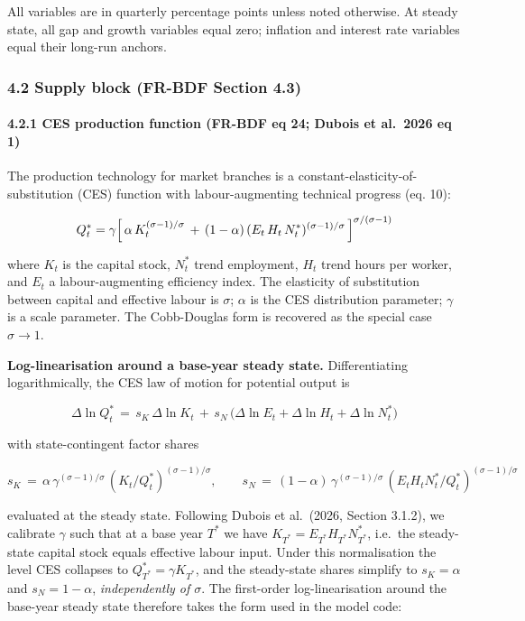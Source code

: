 \documentclass[
]{article}
\begin{document}
All variables are in quarterly percentage points unless noted otherwise.
At steady state, all gap and growth variables equal zero; inflation and
interest rate variables equal their long-run anchors.

\subsubsection{4.2 Supply block (FR-BDF Section
4.3)}\label{supply-block-fr-bdf-section-4.3}

\paragraph{4.2.1 CES production function (FR-BDF eq 24; Dubois et
al.~2026 eq
1)}\label{ces-production-function-fr-bdf-eq-24-dubois-et-al.-2026-eq-1}

The production technology for market branches is a
constant-elasticity-of-substitution (CES) function with
labour-augmenting technical progress (eq. 10):

\[Q^*_t = \gamma \Bigl[\, \alpha\, K_t^{(\sigma-1)/\sigma} \,+\, (1 - \alpha)\,(E_t\, H_t\, N^*_t)^{(\sigma-1)/\sigma} \,\Bigr]^{\sigma/(\sigma-1)}\]

where \(K_t\) is the capital stock, \(N^*_t\) trend employment, \(H_t\)
trend hours per worker, and \(E_t\) a labour-augmenting efficiency
index. The elasticity of substitution between capital and effective
labour is \(\sigma\); \(\alpha\) is the CES distribution parameter;
\(\gamma\) is a scale parameter. The Cobb-Douglas form is recovered as
the special case \(\sigma \rightarrow 1\).

\textbf{Log-linearisation around a base-year steady state.}
Differentiating logarithmically, the CES law of motion for potential
output is

\[\Delta \ln Q^*_t \,=\, s_K \,\Delta \ln K_t \,+\, s_N \,\bigl(\Delta \ln E_t + \Delta \ln H_t + \Delta \ln N^*_t\bigr)\]

with state-contingent factor shares

\[s_K \,=\, \alpha\, \gamma^{(\sigma-1)/\sigma}\, (K_t/Q^*_t)^{(\sigma-1)/\sigma}, \qquad s_N \,=\, (1-\alpha)\, \gamma^{(\sigma-1)/\sigma}\, (E_t H_t N^*_t/Q^*_t)^{(\sigma-1)/\sigma}\]

evaluated at the steady state. Following Dubois et al.~(2026, Section
3.1.2), we calibrate \(\gamma\) such that at a base year \(T^*\) we have
\(K_{T^*} = E_{T^*} H_{T^*} N^*_{T^*}\), i.e.~the steady-state capital
stock equals effective labour input. Under this normalisation the level
CES collapses to \(Q^*_{T^*} = \gamma K_{T^*}\), and the steady-state
shares simplify to \(s_K = \alpha\) and \(s_N = 1 - \alpha\),
\emph{independently of \(\sigma\)}. The first-order log-linearisation
around the base-year steady state therefore takes the form used in the
model code:
\end{document}
